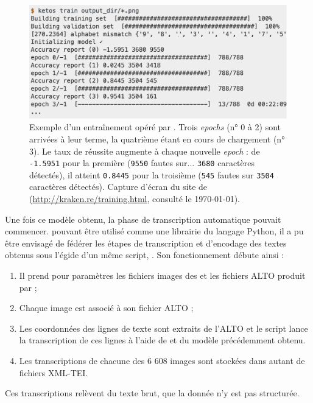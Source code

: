 \begin{figure}
    \centering
    \includegraphics[width=15cm]{img/kraken_training.png}
    \caption[Exemple d'un entraînement opéré par \kraken]{Exemple d'un entraînement opéré par \kraken. Trois \textit{epochs} (n° 0 à 2) sont arrivées à leur terme, la quatrième étant en cours de chargement (n° 3). Le taux de réussite augmente à chaque nouvelle \textit{epoch} : de \texttt{-1.5951} pour la première (\texttt{9550} fautes sur... \texttt{3680} caractères détectés), il atteint \texttt{0.8445} pour la troisième (\texttt{545} fautes sur \texttt{3504} caractères détectés). Capture d'écran du site de \kraken{} (\url{http://kraken.re/training.html}, consulté le \today).}
    \label{fig:kraken_training}
\end{figure}

Une fois ce modèle obtenu, la phase de transcription automatique pouvait commencer. \kraken{} pouvant être utilisé comme une librairie du langage Python, il a pu être envisagé de fédérer les étapes de transcription et d'encodage des textes obtenus sous l'égide d'un même script, \lse. Son fonctionnement débute ainsi :

\begin{enumerate}
    \item Il prend pour paramètres les fichiers images des \odm{} et les fichiers ALTO produit par \transkribus ;
    \item Chaque image est associé à son fichier ALTO ;
    \item Les coordonnées des lignes de texte sont extraits de l'ALTO et le script lance la transcription de ces lignes à l'aide de \kraken{} et du modèle précédemment obtenu.
    \item Les transcriptions de chacune des 6 608 images sont stockées dans autant de fichiers XML-TEI.
\end{enumerate}

Ces transcriptions relèvent du texte brut, \cad{} que la donnée n'y est pas structurée.

